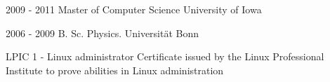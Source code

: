 \documentclass[10pt,letterpaper]{main}
\begin{document}
\setlength{\columnsep}{2.2em}
\setlength{\columnseprule}{2pt}
\begin{paracol}{2}
\begin{leftcolumn}


\cvsection{}

\\[6pt]
\\[6pt]
\\[6pt]
\\[6pt]


~~


\newpage
{}

\cvmetaevent
{2009 - 2011}
{Master of Computer Science}
{University of Iowa}
{}

\cvmetaevent
{2006 - 2009}
{B. Sc. Physics.}
{Universität Bonn}
{}

\newpage
{}

\cvmetaevent
{LPIC 1 - Linux administrator}
{}
{}
{Certificate issued by the Linux Professional Institute to prove abilities in Linux administration}


\end{leftcolumn}
\end{paracol}
\end{document}
